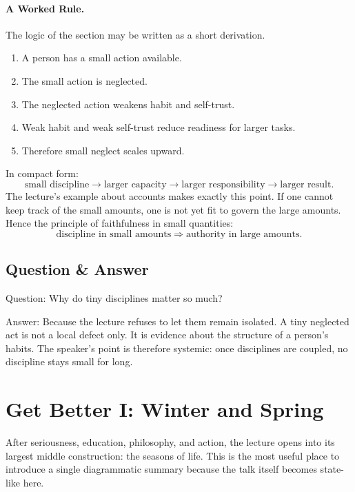 \paragraph{A Worked Rule.}
The logic of the section may be written as a short derivation.
\begin{enumerate}
\item A person has a small action available.
\item The small action is neglected.
\item The neglected action weakens habit and self-trust.
\item Weak habit and weak self-trust reduce readiness for larger tasks.
\item Therefore small neglect scales upward.
\end{enumerate}
In compact form:
\begin{equation}
\text{small discipline} \to \text{larger capacity} \to \text{larger responsibility} \to \text{larger result}.
\end{equation}
The lecture's example about accounts makes exactly this point. If one cannot keep track of the small amounts, one is not yet fit to govern the large amounts. Hence the principle of faithfulness in small quantities:
\begin{equation}
\text{discipline in small amounts} \Rightarrow \text{authority in large amounts}.
\end{equation}

\subsection{Question \& Answer}

Question: Why do tiny disciplines matter so much?

Answer: Because the lecture refuses to let them remain isolated. A tiny neglected act is not a local defect only. It is evidence about the structure of a person's habits. The speaker's point is therefore systemic: once disciplines are coupled, no discipline stays small for long.

\section{Get Better I: Winter and Spring}

After seriousness, education, philosophy, and action, the lecture opens into its largest middle construction: the seasons of life. This is the most useful place to introduce a single diagrammatic summary because the talk itself becomes state-like here.

